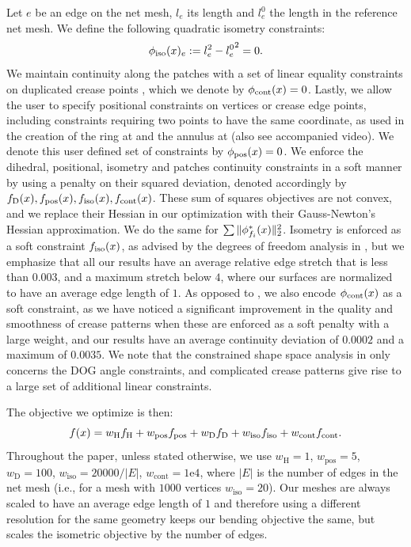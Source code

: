 Let $e$ be an edge on the net mesh, $l_e$ its length and $l_e^0$ the length in the reference net mesh. We define the following quadratic isometry constraints:
\begin{equation}
\phi_\text{iso}(x)_e := l_e^2 - {l_e^0}^2 = 0.
\end{equation}
We maintain continuity along the patches with a set of linear equality constraints on duplicated crease points \cite{rabi2018shape}, which we denote by $\phi_\text{cont}(x) = 0$. Lastly, we allow the user to specify positional constraints on vertices or crease edge points, including constraints requiring two points to have the same coordinate, as used in the creation of the ring at  and the annulus at  (also see accompanied video). We denote this user defined set of constraints by $\phi_{\text{pos}}(x) = 0$.
We enforce the dihedral, positional, isometry and patches continuity constraints in a soft manner by using a penalty on their squared deviation, denoted accordingly by $f_\text{D}(x), f_\text{pos}(x), f_\text{iso}(x), f_\text{cont}(x)$. These sum of squares objectives are not convex, and we replace their Hessian in our optimization with their Gauss-Newton's Hessian approximation. We do the same for $\sum \|\phi^*_{f_i}(x)\|_2^2$. Isometry is enforced as a soft constraint $f_\text{iso}(x)$, as advised by the degrees of freedom analysis in \cite{rabi18,rabi2018shape}, but we emphasize that all our results have an average relative edge stretch that is less than $0.003$, and a maximum stretch below $4$, where our surfaces are normalized to have an average edge length of $1$. As opposed to \cite{rabi2018shape}, we also encode  $\phi_\text{cont}(x)$  as a soft constraint, as we have noticed a significant improvement in the quality and smoothness of crease patterns when these are enforced as a soft penalty with a large weight,
and our results have an average continuity deviation of $0.0002$ and a maximum of $0.0035$. We note that the constrained shape space analysis in \cite{rabi2018shape} only concerns the DOG angle constraints, and complicated crease patterns give rise to a large set of additional linear constraints.
 
The objective we optimize is then:
\begin{equation} \label{eq:opt}
f(x) = w_\text{H}f_\text{H}+w_\text{pos}f_\text{pos}+w_\text{D}f_\text{D}+w_\text{iso}f_\text{iso}+w_\text{cont}f_\text{cont}.
\end{equation}
Throughout the paper, unless stated otherwise, we use $w_\text{H} = 1$, $w_\text{pos}=5$, $w_\text{D} = 100$, $w_\text{iso}= {20000}/{|E|}$, $w_\text{cont} = \text{1e4}$, where $|E|$ is the number of edges in the net mesh (i.e., for a mesh with $1000$ vertices $w_\text{iso}=20$). Our meshes are always scaled to have an average edge length of $1$ and therefore using a different resolution for the same geometry keeps our bending objective the same, but scales the isometric objective by the number of edges.

